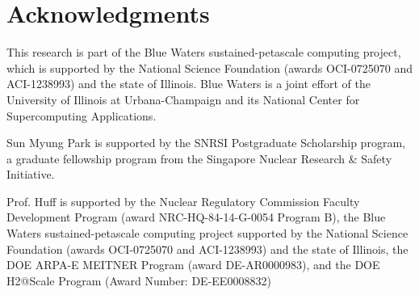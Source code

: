 \section{Acknowledgments}
This research is part of the Blue Waters sustained-petascale computing project,
which is supported by the National Science Foundation (awards OCI-0725070 and
ACI-1238993) and the state of Illinois. Blue Waters is a joint effort of the
University of Illinois at Urbana-Champaign and its National Center for
Supercomputing Applications.

Sun Myung Park is supported by the SNRSI Postgraduate Scholarship program, a
graduate fellowship program from the Singapore Nuclear Research \& Safety
Initiative.

Prof. Huff is supported by the Nuclear Regulatory Commission Faculty
Development Program (award NRC-HQ-84-14-G-0054 Program B), the Blue Waters
sustained-petascale computing project supported by the National Science
Foundation (awards OCI-0725070 and ACI-1238993) and the state of Illinois, the
DOE ARPA-E MEITNER Program (award DE-AR0000983), and the DOE H2@Scale Program
(Award Number: DE-EE0008832)

